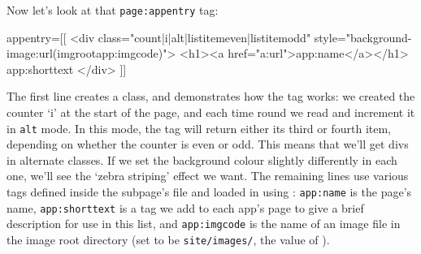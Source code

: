 Now let's look at that \texttt{page:appentry} tag:
\begin{MyVerbatim}
appentry=[[
    <div class="{{count|i|alt|listitemeven|listitemodd}}"
        style="background-image:url({{imgroot}}{{app:imgcode}})">
        <h1><a href="{{a:url}}">{{app:name}}</a></h1>
        {{app:shorttext}}
    </div>
]]
\end{MyVerbatim}
The first line creates a class, and demonstrates how the  tag works: we created
the counter `i' at the start of the page, and each time round we read and increment it in
\texttt{alt} mode. In this mode, the tag will return either its third or fourth item, depending
on whether the counter is even or odd. This means that we'll get divs in alternate classes.
If we set the background colour slightly differently in each one, we'll see the `zebra striping'
effect we want. The remaining lines use various tags defined inside the subpage's file and
loaded in using : \texttt{app:name} is the page's name, \texttt{app:shorttext}
is a tag we add to each app's page to give a brief description for use in this list, and
\texttt{app:imgcode} is the name of an image file in the image root directory (set to be \texttt{site/images/},
the value of ).
\clearpage
